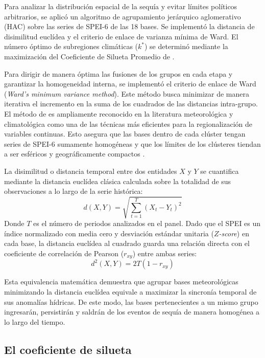 Para analizar la distribución espacial de la sequía y evitar límites políticos arbitrarios, se aplicó un algoritmo de agrupamiento jerárquico aglomerativo (HAC) sobre las series de SPEI-6 de las 18 bases. Se implementó la distancia de disimilitud euclídea y el criterio de enlace de varianza mínima de Ward. El número óptimo de subregiones climáticas ($k^*$) se determinó mediante la maximización del Coeficiente de Silueta Promedio de .

Para dirigir de manera óptima las fusiones de los grupos en cada etapa y garantizar la homogeneidad interna, se implementó el criterio de enlace de Ward (\textit{Ward's minimum variance method}). Este método busca minimizar de manera iterativa el incremento en la suma de los cuadrados de las distancias intra-grupo. El método de  es ampliamente reconocido en la literatura meteorológica y climatológica como una de las técnicas más eficientes para la regionalización de variables continuas. Esto asegura que las bases dentro de cada clúster tengan series de SPEI-6 sumamente homogéneas y que los límites de los clústeres tiendan a ser esféricos y geográficamente compactos \cite{santos2010}.

La disimilitud o distancia temporal entre dos entidades $X$ y $Y$ se cuantifica mediante la distancia euclídea clásica calculada sobre la totalidad de sus observaciones a lo largo de la serie histórica:
\begin{equation}
    d(X, Y) = \sqrt{\sum_{t=1}^{T} (X_t - Y_t)^2}
    \label{eq:euclidea}
\end{equation}
Donde $T$ es el número de periodos analizados en el panel. Dado que el SPEI es un índice normalizado con media cero y desviación estándar unitaria (\textit{$Z$-score}) en cada base, la distancia euclídea al cuadrado guarda una relación directa con el coeficiente de correlación de Pearson ($r_{xy}$) entre ambas series:
\begin{equation}
    d^2(X, Y) = 2T(1 - r_{xy})
\end{equation}

Esta equivalencia matemática demuestra que agrupar bases meteorológicas minimizando la distancia euclídea equivale a maximizar la sincronía temporal de sus anomalías hídricas. De este modo, las bases pertenecientes a un mismo grupo ingresarán, persistirán y saldrán de los eventos de sequía de manera homogénea a lo largo del tiempo.

\subsection{El coeficiente de silueta}

